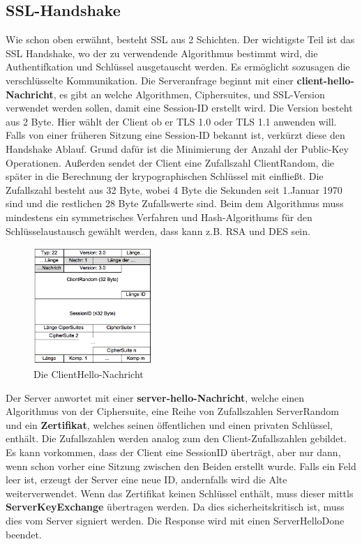 \documentclass[11pt]{scrartcl}
\begin{document}
\subsection{SSL-Handshake}
\label{sec:ssl-handshake}
Wie schon oben erwähnt, besteht SSL aus 2 Schichten. Der wichtigste Teil ist das SSL Handshake, wo der zu verwendende Algorithmus bestimmt wird, die Authentifkation und Schlüssel ausgetauscht werden. Es ermöglicht sozusagen die verschlüsselte Kommunikation. 
Die Serveranfrage beginnt mit einer \textbf{client-hello-Nachricht}, es gibt an welche Algorithmen, Ciphersuites, und SSL-Version verwendet werden sollen, damit eine Session-ID erstellt wird. Die Version besteht aus 2 Byte. Hier wählt der Client ob er TLS 1.0 oder TLS 1.1 anwenden will. Falls von einer früheren Sitzung eine Session-ID bekannt ist, verkürzt diese den Handshake Ablauf. Grund dafür ist die Minimierung der Anzahl der Public-Key Operationen. \grqq{}Außerden sendet der Client eine Zufallszahl ClientRandom, die später in die Berechnung der krypographischen Schlüssel mit einfließt.\grqq{}\cite{1}
Die Zufallszahl besteht aus 32 Byte, wobei 4 Byte die Sekunden seit 1.Januar 1970 sind und die restlichen 28 Byte Zufallswerte sind. Beim dem Algorithmus muss mindestens ein symmetrisches Verfahren und Hash-Algorithums für den Schlüsselaustausch gewählt werden, dass kann z.B. RSA und DES sein. \cite{1}
\begin{figure}[H]
\includegraphics[width=0.40\textwidth]{Bilder/TLS/ClientHello}
	\caption{Die ClientHello-Nachricht \cite{1}}
	\label{fig16}
\end{figure}
\noindent
Der Server anwortet mit einer \textbf{server-hello-Nachricht}, welche einen Algorithmus von der Ciphersuite, eine Reihe von Zufallszahlen ServerRandom und ein \textbf{Zertifikat}, welches seinen öffentlichen und einen privaten Schlüssel, enthält. Die Zufallszahlen werden analog zum den Client-Zufallszahlen gebildet. Es kann vorkommen, dass der Client eine SessionID überträgt, aber nur dann, wenn schon vorher eine Sitzung zwischen den Beiden erstellt wurde. Falls ein Feld leer ist, erzeugt der Server eine neue ID, andernfalls wird die Alte weiterverwendet. Wenn das Zertifikat keinen Schlüssel enthält, muss dieser mittls \textbf{ServerKeyExchange} übertragen werden. Da dies sicherheitskritisch ist, muss dies vom Server signiert werden. Die Response wird mit einen ServerHelloDone beendet.\\
\end{document}
